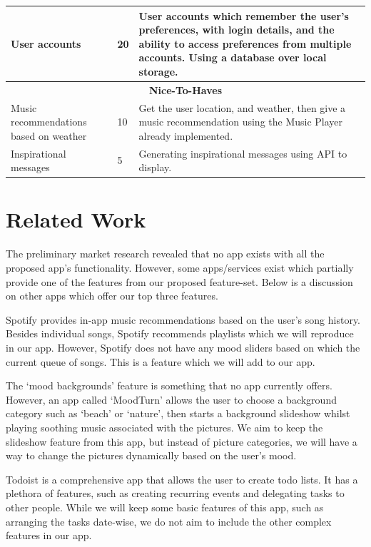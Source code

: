 \documentclass[conference]{IEEEtran}
\begin{document}
\begin{table}[htbp]
{\begin{tabular}{|p{18mm}|p{13mm}|p{45mm}|}
\hline
User accounts & 20 & User accounts which remember the user’s preferences, with login details, and the ability to access preferences from multiple accounts.
Using a database over local storage. \\
\hline
\multicolumn{3}{|c|}{\textbf{Nice-To-Haves}} \\
\hline 
Music recommendations based on weather & 10 & Get the user location, and weather, then give a music recommendation using the Music Player already implemented. \\
\hline
Inspirational messages & 5 & Generating inspirational messages using API to display. \\
\hline
\end{tabular}}
\end{table}


\section{Related Work}


The preliminary market research revealed that no app exists with all the proposed app’s functionality. However, some apps/services exist which partially provide one of the features from our proposed feature-set. Below is a discussion on other apps which offer our top three features.

Spotify provides in-app music recommendations based on the user’s song history. Besides individual songs, Spotify recommends playlists which we will reproduce in our app. However, Spotify does not have any mood sliders based on which the current queue of songs. This is a feature which we will add to our app. 

The ‘mood backgrounds’ feature is something that no app currently offers. However, an app called ‘MoodTurn’ allows the user to choose a background category such as ‘beach’ or ‘nature’, then starts a background slideshow whilst playing soothing music associated with the pictures. We aim to keep the slideshow feature from this app, but instead of picture categories, we will have a way to change the pictures dynamically based on the user’s mood. 

Todoist is a comprehensive app that allows the user to create todo lists. It has a plethora of features, such as creating recurring events and delegating tasks to other people. While we will keep some basic features of this app, such as arranging the tasks date-wise, we do not aim to include the other complex features in our app.
\end{document}
